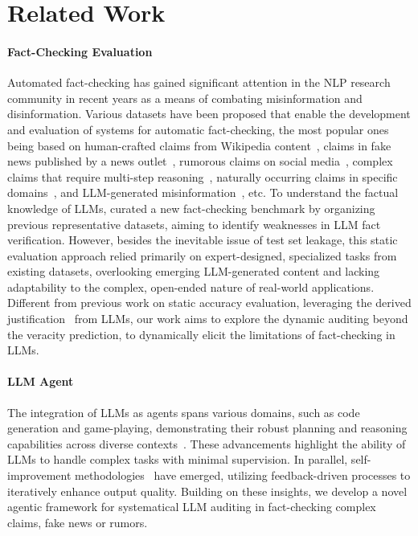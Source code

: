 \section{Related Work}
\vspace{-3pt}
\paragraph{Fact-Checking Evaluation} 
Automated fact-checking has gained significant attention in the NLP research community in recent years as a means of combating misinformation and disinformation. Various datasets have been proposed that enable the development and evaluation of systems for automatic fact-checking, the most popular ones being based on human-crafted claims from Wikipedia content~\cite{thorne2018fever, sathe2020automated, schuster2021get}, claims in fake news published by a news outlet~\cite{buntain2017automatically, shu2020fakenewsnet, nakov2022clef}, rumorous claims on social media~\cite{ma2015detect, ma2017detect, lin2022detect}, complex claims that require multi-step reasoning~\cite{jiang2020hover, aly2021feverous}, naturally occurring claims in specific domains~\cite{gupta2021x, wadden2022scifact, lin2023zero}, and LLM-generated misinformation~\cite{chen2024can}, etc. To understand the factual knowledge of LLMs, \citet{hu2024large} curated a new fact-checking benchmark by organizing previous representative datasets, aiming to identify weaknesses in LLM fact verification. However, besides the inevitable issue of test set leakage, this static evaluation approach relied primarily on expert-designed, specialized tasks from existing datasets, overlooking emerging LLM-generated content and lacking adaptability to the complex, open-ended nature of real-world applications. Different from previous work on static accuracy evaluation, leveraging the derived justification~\cite{atanasova2020generating, guo2022survey} from LLMs, our work aims to explore the dynamic auditing beyond the veracity prediction, to dynamically elicit the limitations of fact-checking in LLMs.

\vspace{-3pt}
\paragraph{LLM Agent} 
The integration of LLMs as agents spans various domains, such as code generation and game-playing, demonstrating their robust planning and reasoning capabilities across diverse contexts~\cite{wang2023voyager, yao2022react, shen2023hugginggpt, mu2023embodiedgpt, hong2023metagpt, liu2023agentbench, sun2023adaplanner, qian2023communicative}. These advancements highlight the ability of LLMs to handle complex tasks with minimal supervision. In parallel, self-improvement methodologies~\cite{chen2022codet, chen2023teaching, shinn2023reflexion, madaan2023self} have emerged, utilizing feedback-driven processes to iteratively enhance output quality. Building on these insights, we develop a novel agentic framework for systematical LLM auditing in fact-checking complex claims, fake news or rumors.